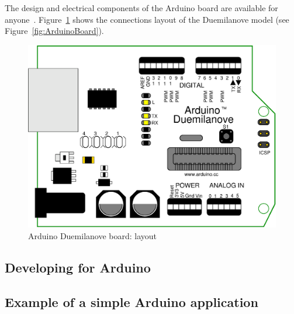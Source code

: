 The design and electrical components of the Arduino board are available for anyone~\cite{Arduino}. Figure~\ref{fig:Arduino_schematics} shows the connections layout of the Duemilanove model (see Figure~\ref{fig:ArduinoBoard}).

\begin{figure}[htbp]
  \centering
  \includegraphics[width=0.7\linewidth]{figures/duemilanove_layout.eps}
  \caption{Arduino Duemilanove board: layout
  \label{fig:Arduino_schematics}}
\end{figure}

\subsection{Developing for Arduino}

\subsection{Example of a simple Arduino application}
